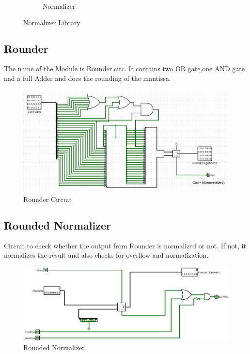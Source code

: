 \documentclass[a4paper,12pt]{article}
\begin{document}
\begin{figure}[H]
\begin{subfigure}[h]{.8\textwidth}
        \caption{Normalizer}
    \end{subfigure}
    \caption{Normalizer Library}
\end{figure}

\subsection{Rounder}
The name of the Module is Rounder.circ. It contains two OR gate,one AND gate
and a full Adder and does the rounding of the mantissa.

\begin{figure}[H]
    \centering
    \includegraphics[width=1\textwidth]{R.png}
    \caption{Rounder Circuit}
    \label{rounder}
\end{figure}

\subsection{Rounded Normalizer}
Circuit to check whether the output from Rounder is normalized or not. If not,
it normalizes the result and also checks for overflow and normalization.

\begin{figure}[H]
    \centering
    \includegraphics[width=1\textwidth]{RoundedNorm.png}
    \caption{Rounded Normalizer}
\end{figure}
\end{document}
